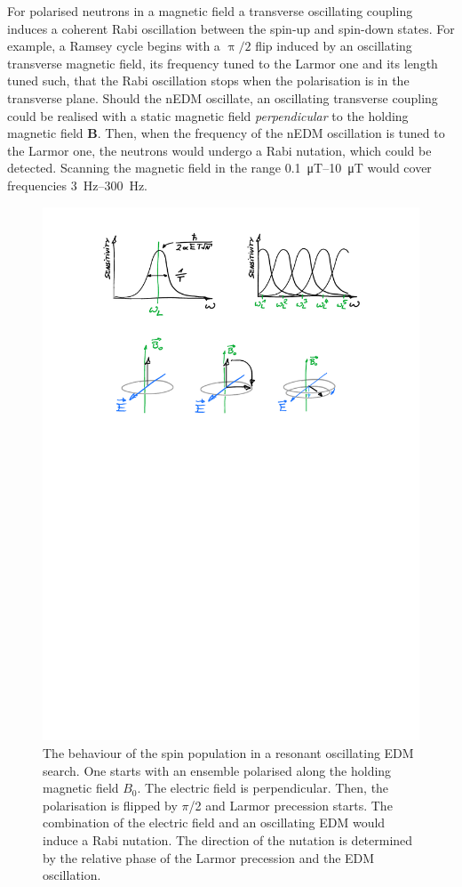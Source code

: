 For polarised neutrons in a magnetic field a transverse oscillating coupling induces a coherent Rabi oscillation between the spin-up and spin-down states.
For example, a Ramsey cycle begins with a $\uppi/2$ flip induced by an oscillating transverse magnetic field, its frequency tuned to the Larmor one and its length tuned such, that the Rabi oscillation stops when the polarisation is in the transverse plane. Should the nEDM oscillate, an oscillating transverse coupling could be realised with a static magnetic field \emph{perpendicular} to the holding magnetic field $\mathbf{B}$. Then, when the frequency of the nEDM oscillation is tuned to the Larmor one, the neutrons would undergo a Rabi nutation, which could be detected. Scanning the magnetic field in the range \SIrange[range-phrase=--]{0.1}{10}{\micro\tesla} would cover frequencies \SIrange[range-phrase=--]{3}{300}{\hertz}.

\begin{figure}
  \centering
  \includegraphics[width=\linewidth]{gfx/axions/resonant_effect.pdf}
  \caption{The behaviour of the spin population in a resonant oscillating EDM search.
  One starts with an ensemble polarised along the holding magnetic field $B_0$.
  The electric field is perpendicular.
  Then, the polarisation is flipped by $\pi$/2 and Larmor precession starts.
  The combination of the electric field and an oscillating EDM would induce a Rabi nutation.
  The direction of the nutation is determined by the relative phase of the Larmor precession and the EDM oscillation.}\label{fig:axions_resonant_effect}
\end{figure}

